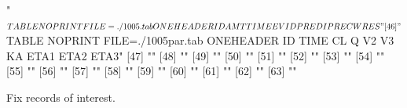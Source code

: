 \begin{Schunk}
\begin{Soutput}
[45] "$TABLE NOPRINT FILE=./1005.tab ONEHEADER ID AMT TIME EVID PRED IPRE CWRES"                   
[46] "$TABLE NOPRINT FILE=./1005par.tab ONEHEADER ID TIME CL Q V2 V3 KA ETA1 ETA2 ETA3"            
[47] ""                                                                                            
[48] ""                                                                                            
[49] ""                                                                                            
[50] ""                                                                                            
[51] ""                                                                                            
[52] ""                                                                                            
[53] ""                                                                                            
[54] ""                                                                                            
[55] ""                                                                                            
[56] ""                                                                                            
[57] ""                                                                                            
[58] ""                                                                                            
[59] ""                                                                                            
[60] ""                                                                                            
[61] ""                                                                                            
[62] ""                                                                                            
[63] ""                                                                                            
\end{Soutput}
\end{Schunk}
Fix records of interest.
